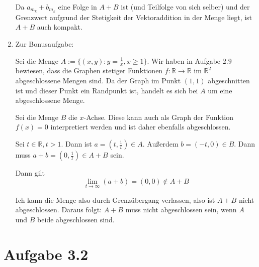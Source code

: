 \documentclass[a4paper,german,12pt,smallheadings]{scrartcl}
\begin{document}
\begin{enumerate}[(1)]
    Da $a_{m_k} + b_{m_k}$ eine Folge in $A+B$ ist (und Teilfolge von sich
    selber) und der Grenzwert aufgrund der Stetigkeit der Vektoraddition in der
    Menge liegt, ist $A+B$ auch kompakt.

  \item
    Zur Bonusaufgabe:

    Sei die Menge $A := \{(x,y): y = \frac{1}{x}, x \ge 1\}$. Wir
    haben in Aufgabe $2.9$ bewiesen, dass die Graphen stetiger Funktionen $f:
    \mathbb{R} \to \mathbb{R}$ im $\mathbb{R}^2$ abgeschlossene Mengen sind. Da der
    Graph im Punkt $(1,1)$ abgeschnitten ist und dieser Punkt ein Randpunkt ist,
    handelt es sich bei $A$ um eine abgeschlossene Menge.

    Sei die Menge $B$ die $x$-Achse. Diese kann auch als Graph der Funktion $f(x) =
    0$ interpretiert werden und ist daher ebenfalls abgeschlossen.

    Sei $t \in \mathbb{R}, t > 1$. Dann ist $a = (t, \frac{1}{t}) \in A$. Außerdem
    $b = (-t, 0) \in B$. Dann muss $a+b = (0, \frac{1}{t}) \in A+B$ sein.

    Dann gilt
    \begin{equation*}
      \lim_{t \to \infty} (a+b) = (0,0) \notin A+B
    \end{equation*}

    Ich kann die Menge also durch Grenzübergang verlassen, also ist $A+B$ nicht
    abgeschlossen. Daraus folgt: $A + B$ muss nicht abgeschlossen sein, wenn $A$
    und $B$ beide abgeschlossen sind.
\end{enumerate}

\section*{Aufgabe 3.2}
\end{document}
